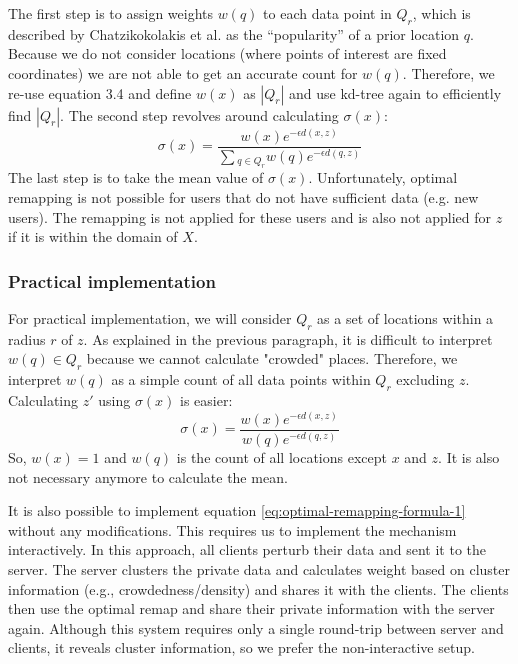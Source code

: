 The first step is to assign weights $w(q) $ to each data point in $Q_r$, which is described by Chatzikokolakis et al. as the “popularity” of a prior location $q$.
Because we do not consider locations (where points of interest are fixed coordinates) we are not able to get an accurate count for $w(q)$.
Therefore, we re-use equation 3.4 and define $ w(x)$ as $ |Q_r|$ and use kd-tree again to efficiently find $|Q_r|$.
The second step revolves around calculating $\sigma(x)$:
\begin{equation}
  \sigma(x) = \frac{w(x)e^{-\epsilon d(x, z)}}{\sum{_{q\in Q_r} w(q)e^{-\epsilon d(q, z)}}}
  \label{eq:optimal-remapping-formula-1}
\end{equation}
The last step is to take the mean value of $\sigma(x)$.
Unfortunately, optimal remapping is not possible for users that do not have sufficient data (e.g. new users).
The remapping is not applied for these users and is also not applied for $z$ if it is within the domain of $X$.

\subsubsection{Practical implementation}
For practical implementation, we will consider $Q_r$ as a set of locations within a radius $r$ of $z$.
As explained in the previous paragraph, it is difficult to interpret $w(q) \in Q_r$ because we cannot calculate "crowded" places.
Therefore, we interpret $w(q)$ as a simple count of all data points within $Q_r$ excluding $z$. Calculating $z'$ using $\sigma(x)$ is easier:
\begin{equation}
  \sigma(x) = \frac{w(x)e^{-\epsilon d(x, z)}}{w(q)e^{-\epsilon d(q, z)}}
  \label{eq:optimal-remapping-formula-2}
\end{equation}
So, $w(x) = 1$ and $w(q)$ is the count of all locations except $x$ and $z$. It is also not necessary anymore to calculate the mean.

It is also possible to implement equation \ref{eq:optimal-remapping-formula-1} without any modifications.
This requires us to implement the mechanism interactively.
In this approach, all clients perturb their data and sent it to the server.
The server clusters the private data and calculates weight based on cluster information (e.g., crowdedness/density) and shares it with the clients.
The clients then use the optimal remap and share their private information with the server again.
Although this system requires only a single round-trip between server and clients, it reveals cluster information, so we prefer the non-interactive setup.